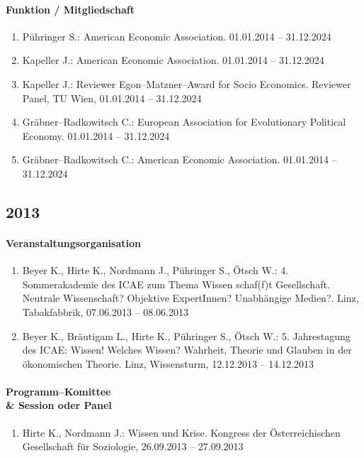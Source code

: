 \paragraph{Funktion / Mitgliedschaft}
\begin{enumerate}[leftmargin=*, labelsep=0.5cm]
\item Pühringer S.: American Economic Association. 01.01.2014 -- 31.12.2024
\item Kapeller J.: American Economic Association. 01.01.2014 -- 31.12.2024
\item Kapeller J.: Reviewer Egon--Matzner--Award for Socio Economics. Reviewer Panel, TU Wien, 01.01.2014 -- 31.12.2024
\item Gräbner--Radkowitsch C.: European Association for Evolutionary Political Economy. 01.01.2014 -- 31.12.2024
\item Gräbner--Radkowitsch C.: American Economic Association. 01.01.2014 -- 31.12.2024
\end{enumerate}
\subsection*{2013}
\paragraph{Veranstaltungsorganisation}
\begin{enumerate}[leftmargin=*, labelsep=0.5cm]
\item Beyer K., Hirte K., Nordmann J., Pühringer S., Ötsch W.: 4. Sommerakademie des ICAE zum Thema  	  Wissen schaf(f)t Gesellschaft. Neutrale Wissenschaft? Objektive ExpertInnen? Unabhängige Medien?. Linz, Tabakfabbrik, 07.06.2013 -- 08.06.2013
\item Beyer K., Bräutigam L., Hirte K., Pühringer S., Ötsch W.: 5. Jahrestagung des ICAE: Wissen! Welches Wissen? Wahrheit, Theorie und Glauben in der ökonomischen Theorie. Linz, Wissensturm, 12.12.2013 -- 14.12.2013
\end{enumerate}

\paragraph{Programm--Komittee \\\& Session oder Panel}
\begin{enumerate}[leftmargin=*, labelsep=0.5cm]
\item Hirte K., Nordmann J.: Wissen und Krise. Kongress der Österreichischen Gesellschaft für Soziologie, 26.09.2013 -- 27.09.2013
\end{enumerate}

